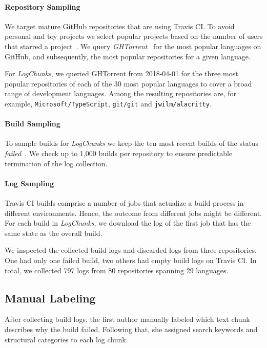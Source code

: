 \documentclass[sigconf]{acmart}
\newcommand{\logchunks}{\emph{LogChunks}\xspace}
\begin{document}
\paragraph{Repository Sampling}
We target mature GitHub repositories that are using Travis CI\@.
To avoid personal and toy projects we select popular projects based
on the number of users that starred a project~\cite{kalliamvakou2016depth}.
We query \emph{GHTorrent}~\cite{gousios2013ghtorrent} for the
most popular languages on GitHub, and subsequently, the most popular
repositories for a given language.

For \logchunks, we queried GHTorrent from 2018-04-01 for the three
most popular repositories of each of the 30 most popular languages
to cover a broad range of development languages.
Among the resulting repositories are, for example,
\texttt{Microsoft/TypeScript}, \texttt{git/git} and \texttt{jwilm/alacritty}.

\paragraph{Build Sampling}
To sample builds for \logchunks we keep the ten most recent builds of the status 
\emph{failed}~\cite{travis2009buildstatus}. We check up to 1,000 builds per 
repository to ensure predictable termination of the log collection.
\paragraph{Log Sampling}
Travis CI builds comprise a number of jobs that actualize a build
process in different environments. Hence, the outcome from different
jobs might be different. For each build in \logchunks, we download the log of the
first job that has the same state as the overall build.

We inspected the collected
build logs and discarded logs from three repositories.  One had only
one failed build, two others had empty build logs on Travis CI\@.  In
total, we collected 797 logs from 80 repositories spanning 29
languages.

\subsection{Manual Labeling}
\label{sec:labeling-process}
After collecting build logs, the first author manually labeled which
text chunk describes why the build failed. Following that, she
assigned search keywords and structural categories to each log chunk.
\end{document}
